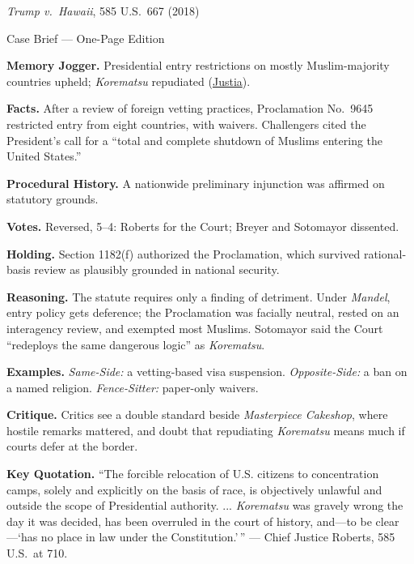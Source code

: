 \documentclass[12pt]{article}
\begin{document}
\begin{center}
{\Large \textit{Trump v.\ Hawaii}, 585 U.S.\ 667 (2018)\par}
\vspace{0.3em}
{\normalsize Case Brief --- One-Page Edition\par}
\end{center}

\textbf{Memory Jogger.} Presidential entry restrictions on mostly Muslim-majority countries upheld; \textit{Korematsu} repudiated (\href{https://supreme.justia.com/cases/federal/us/585/17-965/}{Justia}).

\textbf{Facts.} After a review of foreign vetting practices, Proclamation No.~9645 restricted entry from eight countries, with waivers. Challengers cited the President's call for a ``total and complete shutdown of Muslims entering the United States.''

\textbf{Procedural History.} A nationwide preliminary injunction was affirmed on statutory grounds.

\textbf{Votes.} Reversed, 5--4: Roberts for the Court; Breyer and Sotomayor dissented.

\textbf{Holding.} Section 1182(f) authorized the Proclamation, which survived rational-basis review as plausibly grounded in national security.

\textbf{Reasoning.} The statute requires only a finding of detriment. Under \textit{Mandel}, entry policy gets deference; the Proclamation was facially neutral, rested on an interagency review, and exempted most Muslims. Sotomayor said the Court ``redeploys the same dangerous logic'' as \textit{Korematsu}.

\textbf{Examples.} \emph{Same-Side:} a vetting-based visa suspension. \emph{Opposite-Side:} a ban on a named religion. \emph{Fence-Sitter:} paper-only waivers.

\textbf{Critique.} Critics see a double standard beside \textit{Masterpiece Cakeshop}, where hostile remarks mattered, and doubt that repudiating \textit{Korematsu} means much if courts defer at the border.

\textbf{Key Quotation.} ``The forcible relocation of U.S. citizens to concentration camps, solely and explicitly on the basis of race, is objectively unlawful and outside the scope of Presidential authority. ... \textit{Korematsu} was gravely wrong the day it was decided, has been overruled in the court of history, and---to be clear---`has no place in law under the Constitution.'\,'' --- Chief Justice Roberts, 585 U.S.\ at 710.
\end{document}
